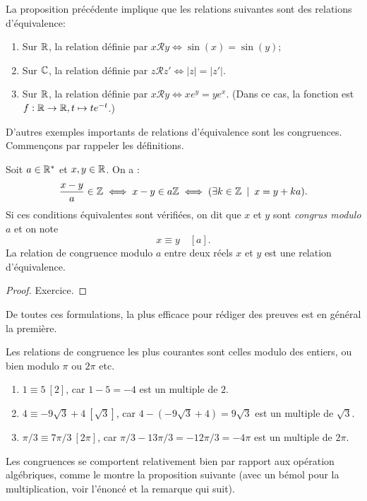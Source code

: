 \begin{exemple} La proposition précédente implique que les relations suivantes sont des relations d'équivalence:
\begin{enumerate}
\item Sur $\mathbb{R}$, la relation définie par $x\mathcal R y \iff \sin(x)=\sin(y)$;
\item Sur $\mathbb{C}$, la relation définie par $z\mathcal R z' \iff |z|=|z'|$.
\item Sur $\mathbb{R}$, la relation définie par $x\mathcal R y \iff xe^y=ye^x$. (Dans ce cas, la fonction est $f :\mathbb{R}\to \mathbb{R}, t\mapsto te^{-t}$.)
\end{enumerate}
\end{exemple}

D'autres exemples importants de relations d'équivalence sont les congruences. Commençons par rappeler les définitions.

\begin{propdef}
Soit $a\in \mathbb{R}^*$ et $x,y\in\mathbb{R}$. On a :
\[
\frac{x-y}{a}\in \mathbb{Z} 
\iff
x-y \in a\mathbb{Z}
\iff 
(\exists k\in \mathbb{Z}\:\mid\: x=y+ka).
\]
Si ces conditions équivalentes sont vérifiées, on dit que $x$ et $y$ sont \emph{congrus modulo $a$} et on note 
\[ x\equiv y\quad [a].\]
La relation de congruence modulo $a$ entre deux réels $x$ et $y$ est une relation d'équivalence.
\end{propdef}
\begin{proof}
Exercice.
\end{proof}

De toutes ces formulations, la plus efficace pour rédiger des preuves est en général la première.

Les relations de congruence les plus courantes sont celles modulo des entiers, ou bien modulo $\pi$ ou $2\pi$ etc.


\begin{exemples}
\begin{enumerate}[label=\alph*)]
\item $1 \equiv 5 \: [2]$, car $1-5 = -4$ est un multiple de $2$.
\item $4\equiv -9\sqrt{3}+4 \: [\sqrt{3}]$, car $4 - (-9\sqrt{3}+4) = 9\sqrt{3}$ est un multiple de $\sqrt{3}$.
\item $\pi/3 \equiv 7\pi/3 \: [2\pi]$, car $\pi/3 - 13\pi/3 = -12\pi/3 = -4\pi$ est un multiple de $2\pi$.
\end{enumerate}
\end{exemples}

Les congruences se comportent relativement bien par rapport aux opération algébriques, comme le montre la proposition suivante (avec un bémol pour la multiplication, voir l'énoncé et la remarque qui suit).

